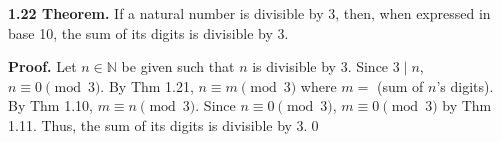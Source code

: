 \documentclass[12pt]{article}
\begin{document}
\noindent\textbf{1.22 Theorem.} If a natural number is divisible by 3, then, when expressed in base 10, the sum of its digits is divisible by 3.

\bigskip

\noindent\textbf{Proof.} Let $n\in\mathbb{N}$ be given such that $n$ is divisible by 3. Since $3\mid n$, $n\equiv 0\pmod{3}$. By Thm 1.21, $n\equiv m\pmod{3}$ where $m=$ (sum of $n$'s digits). By Thm 1.10, $m\equiv n\pmod{3}$. Since $n\equiv 0\pmod{3}$, $m\equiv 0\pmod{3}$ by Thm 1.11. Thus, the sum of its digits is divisible by 3.\qed
\end{document}
